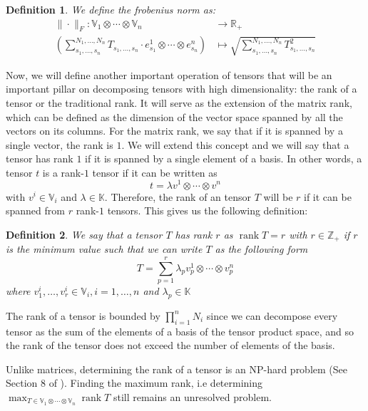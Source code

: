 \documentclass[11pt,a4paper,openright,oneside]{book}
\numberwithin{equation}{section}
\newtheorem{defn0}{Definition}[chapter]
\newenvironment{definition}{ \begin{defn0}}{\end{defn0}}
\DeclareMathOperator{\rank}{rank}
\begin{document}
\begin{definition}
    We define the frobenius norm as:
    $$\begin{align}
        \| \cdot \|_F : \mathbb{V}_1 \otimes \cdots \otimes \mathbb{V}_n & \longrightarrow \mathbb{R}_+ \\
        \left( \sum_{s_1, \dots, s_n}^{N_1, \dots, N_n} T_{s_1, \dots, s_n} \cdot e_{s_1}^1 \otimes \cdots \otimes e_{s_n}^n \right) & \longmapsto 
        \sqrt{\sum_{s_1, \dots, s_n}^{N_1, \dots, N_n} T_{s_1, \dots, s_n}^2}
    \end{align}$$
\end{definition}

Now, we will define another important operation of tensors that will be an important pillar on decomposing tensors with high
dimensionality: the rank of a tensor or the traditional rank. It will serve as the extension of the
matrix rank, which can be defined as the dimension of the vector space spanned by all the vectors
on its columns. For the matrix rank, we say that if it is spanned by a single vector, the rank is $1$. We
will extend this concept and we will say that a tensor has rank $1$ if it is spanned by a single
element of a basis. In other words, a tensor $t$ is a rank-$1$ tensor if it can be written as $$t = \lambda v^1 \otimes \cdots \otimes v^n$$
with $v^i \in \mathbb{V}_i$ and $\lambda \in \mathbb{K}$. Therefore, the rank of an tensor $T$ will be $r$ if it can be spanned from $r$ rank-$1$ tensors.
This gives us the following definition:

\begin{definition}
    We say that a tensor $T$ has rank $r$ as $\rank{T} = r$ with 
    $r \in \mathbb{Z}_+$ if $r$ is the minimum value such that we can write $T$ as the following form
    \begin{equation}
        T= \sum_{p=1}^r \lambda_p v_p^1 \otimes \cdots \otimes v_p^n
        \label{eq:rank}
    \end{equation}
    where $v_1^i, \dots, v_r^i \in \mathbb{V}_i, i = 1, \dots, n$ and $\lambda_p \in \mathbb{K}$
\end{definition}

The rank of a tensor is bounded by $\prod_{i=1}^n N_i$ since we can decompose every tensor as the sum
of the elements of a basis of the tensor product space, and so the rank of the tensor does not exceed the number
of elements of the basis.

Unlike matrices, determining the rank of a tensor is an NP-hard problem (See Section 8 of \cite{hillarMostTensorProblems2013}).
Finding the maximum rank, i.e determining $\displaystyle\max_{T \in \mathbb{V}_1 \otimes \cdots \otimes \mathbb{V}_n} \rank{T}$ still remains an unresolved problem.
\cite{christandlTensorRankNot2018}
\end{document}
